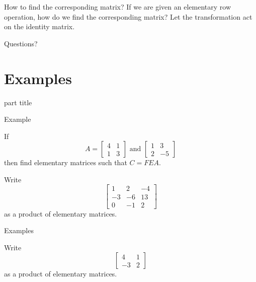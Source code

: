 \documentclass{beamer}
\begin{document}
\begin{frame}{How to find the corresponding matrix?}
  If we are given an elementary row operation, how do we find the corresponding matrix?
  Let the transformation act on the identity matrix.
\end{frame}

\begin{frame}
  Questions?
\end{frame}

\section{Examples}

\begin{frame}
  \begin{beamercolorbox}[sep=12pt,center]{part title}
    \insertsection\par
  \end{beamercolorbox}
\end{frame}

\begin{frame}{Example}
  \begin{example}
    If
    \begin{equation*}
      A = \left[
        \begin{array}{cc}
          4&1\\
          1&3
        \end{array}
      \right]\text{ and }
      \left[
        \begin{array}{cc}
          1&3\\
          2&-5
        \end{array}
      \right]
    \end{equation*}
    then find elementary matrices such that $C = FEA$.
  \end{example}
  \begin{example}
    Write
    \begin{equation*}
      \left[
	\begin{array}{ccc}
          1&2&-4\\
          -3&-6&13\\
          0&-1&2
	\end{array}
      \right]
    \end{equation*}
    as a product of elementary matrices.
  \end{example}
\end{frame}

\begin{frame}{Examples}
  \begin{example}
    Write
    \begin{equation*}
      \left[
	\begin{array}{cc}
          4&1\\
          -3&2
	\end{array}
      \right]
    \end{equation*}
    as a product of elementary matrices.
  \end{example}
\end{frame}
\end{document}
